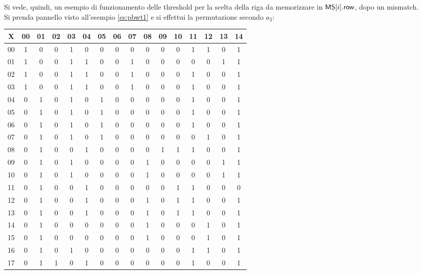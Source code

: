 \begin{esempio}
  \label{es:thr}
  Si vede, quindi, un esempio di funzionamento delle threshold per la scelta
  della riga da memorizzare in $\mbox{\rm {\sf MS}}[i].\mbox{\rm {\sf row}}$, dopo un mismatch.\\
  Si prenda pannello visto all'esempio \ref{es:pbwt1} e si effettui la
  permutazione secondo $a_2$:
  \begin{table}[H]
    \centering
    \footnotesize
    \begin{tabular}{c|cc|c|cccccccccccc}
      X & 00 & 01 & 02 & 03 & 04 & 05 & 06 & 07 & 08 & 09 & 10 & 11 & 12 & 13
      & 14 \\
      \hline
      00 & 1 & 0 & 0 & 1 & 0 & 0 & 0 & 0 & 0 & 0 & 0 & 1 & 1 & 0 & 1 \\
      01 & 1 & 0 & 0 & 1 & 1 & 0 & 0 & 1 & 0 & 0 & 0 & 0 & 0 & 1 & 1 \\
      02 & 1 & 0 & 0 & 1 & 1 & 0 & 0 & 1 & 0 & 0 & 0 & 1 & 0 & 0 & 1 \\
      03 & 1 & 0 & 0 & 1 & 1 & 0 & 0 & 1 & 0 & 0 & 0 & 1 & 0 & 0 & 1 \\
      04 & 0 & 1 & 0 & 1 & 0 & 1 & 0 & 0 & 0 & 0 & 0 & 1 & 0 & 0 & 1 \\
      05 & 0 & 1 & 0 & 1 & 0 & 1 & 0 & 0 & 0 & 0 & 0 & 1 & 0 & 0 & 1 \\
      06 & 0 & 1 & 0 & 1 & 0 & 1 & 0 & 0 & 0 & 0 & 0 & 1 & 0 & 0 & 1 \\
      07 & 0 & 1 & 0 & 1 & 0 & 1 & 0 & 0 & 0 & 0 & 0 & 0 & 1 & 0 & 1 \\
      08 & 0 & 1 & 0 & 0 & 1 & 0 & 0 & 0 & 0 & 1 & 1 & 1 & 0 & 0 & 1 \\
      09 & 0 & 1 & 0 & 1 & 0 & 0 & 0 & 0 & 1 & 0 & 0 & 0 & 0 & 1 & 1 \\
      10 & 0 & 1 & 0 & 1 & 0 & 0 & 0 & 0 & 1 & 0 & 0 & 0 & 0 & 1 & 1 \\
      11 & 0 & 1 & 0 & 0 & 1 & 0 & 0 & 0 & 0 & 0 & 1 & 1 & 0 & 0 & 0 \\
      12 & 0 & 1 & 0 & 0 & 1 & 0 & 0 & 0 & 1 & 0 & 1 & 1 & 0 & 0 & 1 \\
      13 & 0 & 1 & 0 & 0 & 1 & 0 & 0 & 0 & 1 & 0 & 1 & 1 & 0 & 0 & 1 \\
      14 & 0 & 1 & 0 & 0 & 0 & 0 & 0 & 0 & 1 & 0 & 0 & 0 & 1 & 0 & 1 \\
      15 & 0 & 1 & 0 & 0 & 0 & 0 & 0 & 0 & 1 & 0 & 0 & 0 & 1 & 0 & 1 \\
      16 & 0 & 1 & 0 & 1 & 0 & 0 & 0 & 0 & 0 & 0 & 0 & 1 & 1 & 0 & 1 \\
      17 & 0 & 1 & 1 & 0 & 1 & 0 & 0 & 0 & 0 & 0 & 0 & 1 & 0 & 0 & 1 \\

\end{tabular}
\end{table}
\end{esempio}
